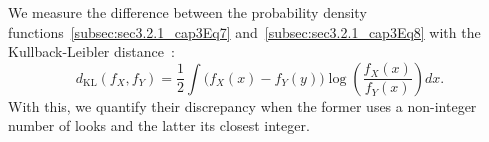 \documentclass[remotesensing,article,submit,pdftex,moreauthors]{Definitions/mdpi}
\begin{document}
%	

We measure the difference between the probability density functions~\eqref{subsec:sec3.2.1_cap3Eq7} and~\eqref{subsec:sec3.2.1_cap3Eq8} with the Kullback-Leibler distance~\cite{AnalyticExpressionsforStochasticDistancesBetweenRelaxedComplexWishartDistributions}:
\begin{equation}\label{dKL}
	d_{\mathrm{KL}}(f_{X}, f_{Y}) 
	=\frac{1}{2} \int\big(f_{X}(x)-f_{Y}(y)\big) \log\left( \frac{f_{X}(x)}{f_{Y}(x)}\right) dx.
\end{equation}
With this, we quantify their discrepancy when the former uses a non-integer number of looks and the latter its closest integer. 

\end{document}
